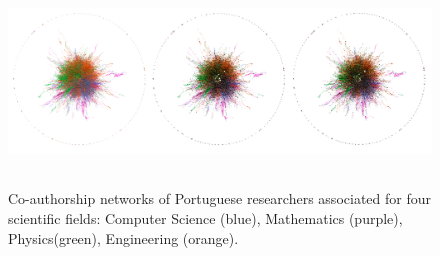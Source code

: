 \documentclass{article}
\begin{document}

\begin{figure}[ht]
\centering
\includegraphics[width=15cm,height=5.5cm]{Figures/ALL}
\caption{Co-authorship networks of Portuguese researchers associated for four scientific fields: Computer Science (blue), Mathematics (purple), Physics(green), Engineering (orange).}
\label{fig:figure9}
\end{figure}
\end{document}
